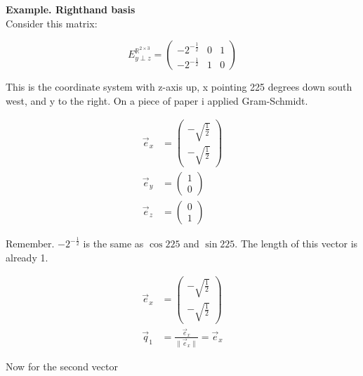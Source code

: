 \documentclass[a4paper]{article}
\begin{document}
\begin{PropositionOpt4}
\textbf{Example. Righthand basis}\\

Consider this matrix:

\begin{displaymath}
    E^{\mathbb{R}^{2\times{3}}}_{y\perp z} = \begin{pmatrix}-2^{-\frac12}&0&1\\-2^{-\frac12}&1&0\end{pmatrix}
\end{displaymath}

This is the coordinate system with z-axis up, x pointing 225 degrees down south west, and y to the right.
On a piece of paper i applied Gram-Schmidt.

\begin{displaymath}
\begin{align}
\vec{e}_{x} &= \begin{pmatrix}-\sqrt{\frac12}\\-\sqrt{\frac12}\end{pmatrix}\\
\vec{e}_{y} &= \begin{pmatrix}1\\0\end{pmatrix}\\
\vec{e}_{z} &= \begin{pmatrix}0\\1\end{pmatrix}
\end{align}
\end{displaymath}

Remember. $-2^{-\frac12}$ is the same as $\cos 225$ and $\sin 225$. The length of this vector is already 1.

\begin{displaymath}
\begin{align}
\vec{e}_{x} &= \begin{pmatrix}-\sqrt{\frac12}\\-\sqrt{\frac12}\end{pmatrix}\\
\vec{q}_{1} &= \frac{\vec{e}_{x}}{\|\vec{e}_{x}\|} = \vec{e}_{x}
\end{align}
\end{displaymath}

Now for the second vector\\


\end{PropositionOpt4}
\end{document}
